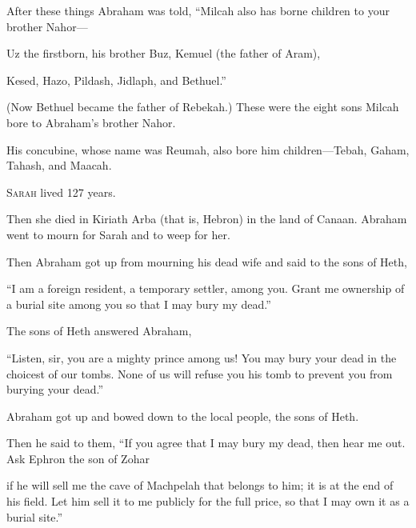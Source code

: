 \begin{scripture}
 After these things Abraham was told, ``Milcah also has borne children to your brother Nahor---
 Uz the firstborn, his brother Buz, Kemuel (the father of Aram),
 Kesed, Hazo, Pildash, Jidlaph, and Bethuel.''
 (Now Bethuel became the father of Rebekah.) These were the eight sons Milcah bore to Abraham's brother Nahor.
 His concubine, whose name was Reumah, also bore him children---Tebah, Gaham, Tahash, and Maacah.

 \allowchapbreak\hypertarget{ch-genesis-23}{}\lettrine[lines=5]{\color{pentateuch}S}{\textsc{arah}} lived 127 years.\everypar{}
 Then she died in Kiriath Arba (that is, Hebron) in the land of Canaan. Abraham went to mourn for Sarah and to weep for her.
\\\indent{} Then Abraham got up from mourning his dead wife and said to the sons of Heth,
 ``I am a foreign resident, a temporary settler, among you. Grant me ownership of a burial site among you so that I may bury my dead.''
\\\indent{} The sons of Heth answered Abraham,
 ``Listen, sir, you are a mighty prince among us! You may bury your dead in the choicest of our tombs. None of us will refuse you his tomb to prevent you from burying your dead.''
\everypar{}

 Abraham got up and bowed down to the local people, the sons of Heth.
 Then he said to them, ``If you agree that I may bury my dead, then hear me out. Ask Ephron the son of Zohar
 if he will sell me the cave of Machpelah that belongs to him; it is at the end of his field. Let him sell it to me publicly for the full price, so that I may own it as a burial site.''
\everypar{}


\end{scripture}
